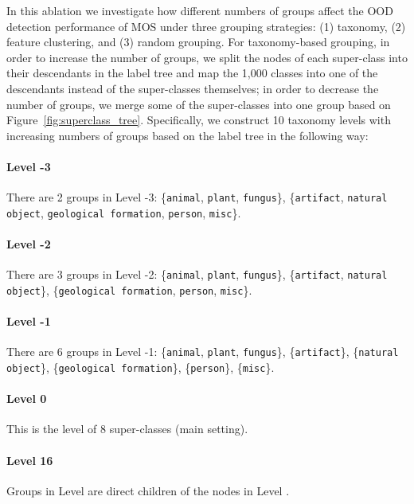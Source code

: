 \documentclass[final]{cvpr}
\begin{document}
In this ablation we investigate how different numbers of groups   affect the OOD detection performance of MOS under three grouping strategies: (1) taxonomy, (2) feature clustering, and (3) random grouping. For taxonomy-based grouping, in order to increase the number of groups, we split the nodes of each super-class into their descendants in the label tree and map the 1,000 classes into one of the descendants instead of the super-classes themselves; in order to decrease the number of groups, we merge some of the super-classes into one group based on Figure~\ref{fig:superclass_tree}. Specifically, we construct 10 taxonomy levels with increasing numbers of groups based on the label tree in the following way:

\vspace{-0.4cm}
\paragraph{Level -3} There are 2 groups in Level -3: \{\texttt{animal}, \texttt{plant}, \texttt{fungus}\}, \{\texttt{artifact}, \texttt{natural object}, \texttt{geological formation}, \texttt{person}, \texttt{misc}\}.

\vspace{-0.4cm}
\paragraph{Level -2} There are 3 groups in Level -2: \{\texttt{animal}, \texttt{plant}, \texttt{fungus}\}, \{\texttt{artifact}, \texttt{natural object}\}, \{\texttt{geological formation}, \texttt{person}, \texttt{misc}\}.

\vspace{-0.4cm}
\paragraph{Level -1} There are 6 groups in Level -1: \{\texttt{animal}, \texttt{plant}, \texttt{fungus}\}, \{\texttt{artifact}\}, \{\texttt{natural object}\}, \{\texttt{geological formation}\}, \{\texttt{person}\}, \{\texttt{misc}\}.

\vspace{-0.4cm}
\paragraph{Level 0} This is the level of 8 super-classes (main setting).

\vspace{-0.4cm}
\paragraph{Level 16} Groups in Level  are direct children of the nodes in Level .
\end{document}
